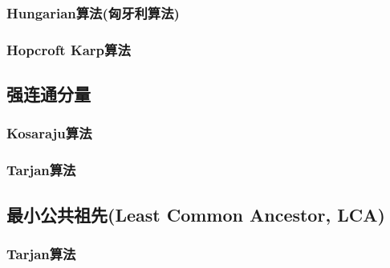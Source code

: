 \subsubsection{Hungarian算法(匈牙利算法)}
\subsubsection{Hopcroft Karp算法}

\subsection{强连通分量}
\subsubsection{Kosaraju算法}
\subsubsection{Tarjan算法}

\subsection{最小公共祖先(Least Common Ancestor, LCA)}
\subsubsection{Tarjan算法}

